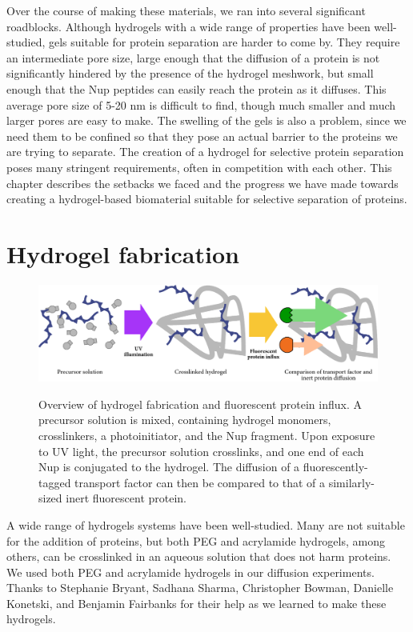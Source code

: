 Over the course of making these materials, we ran into several significant roadblocks.  Although hydrogels with a wide range of properties have been well-studied, gels suitable for protein separation are harder to come by.  They require an intermediate pore size, large enough that the diffusion of a protein is not significantly hindered by the presence of the hydrogel meshwork, but small enough that the Nup peptides can easily reach the protein as it diffuses.  This average pore size of 5-20 nm is difficult to find, though much smaller and much larger pores are easy to make.  The swelling of the gels is also a problem, since we need them to be confined so that they pose an actual barrier to the proteins we are trying to separate.  The creation of a hydrogel for selective protein separation poses many stringent requirements, often in competition with each other.  This chapter describes the setbacks we faced and the progress we have made towards creating a hydrogel-based biomaterial suitable for selective separation of proteins.


\section{Hydrogel fabrication}

\begin{figure}
\caption{Overview of hydrogel fabrication and fluorescent protein influx. A precursor solution is mixed, containing hydrogel monomers, crosslinkers, a photoinitiator, and the Nup fragment.  Upon exposure to UV light, the precursor solution crosslinks, and one end of each Nup is conjugated to the hydrogel.  The diffusion of a fluorescently-tagged transport factor can then be compared to that of a similarly-sized inert fluorescent protein.}
\centering
\includegraphics[width=\textwidth]{figs/ch03/precursor}
\label{fig:precursor}
\end{figure}

A wide range of hydrogels systems have been well-studied.  Many are not suitable for the addition of proteins, but both PEG and acrylamide hydrogels, among others, can be crosslinked in an aqueous solution that does not harm proteins.  We used both PEG and acrylamide hydrogels in our diffusion experiments.  Thanks to Stephanie Bryant, Sadhana Sharma, Christopher Bowman, Danielle Konetski, and Benjamin Fairbanks for their help as we learned to make these hydrogels.

